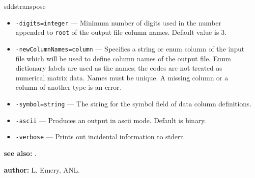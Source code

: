 \begin{sddsprog}{sddstranspose}
\begin{itemize}
      \item \verb|-digits=integer| --- Minimum number of digits used in the number appended to \verb|root| of the output file column names. Default value is 3.
      \item \verb|-newColumnNames=column| --- Specifies a string or enum column of the input file which will be used to define column names of the output file. Enum dictionary labels are used as the names; the codes are not treated as numerical matrix data. Names must be unique. A missing column or a column of another type is an error.
      \item \verb|-symbol=string| --- The string for the symbol field of data column definitions.
      \item \verb|-ascii| --- Produces an output in ascii mode. Default is binary.
      \item \verb|-verbose| --- Prints out incidental information to stderr.
    \end{itemize}
  \item \textbf{see also:} .
  \item \textbf{author:} L. Emery, ANL.
\end{sddsprog}

